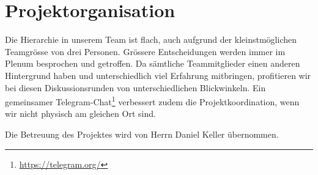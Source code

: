 \documentclass[a4paper]{article}
\let\oldsection\section
\renewcommand\section{\clearpage\oldsection}
\begin{document}
\section{Projektorganisation}
Die Hierarchie in unserem Team ist flach, auch aufgrund der kleinstmöglichen Teamgrösse von drei Personen. Grössere Entscheidungen werden immer im Plenum besprochen und getroffen. Da sämtliche Teammitglieder einen anderen Hintergrund haben und unterschiedlich viel Erfahrung mitbringen, profitieren wir bei diesen Diskussionsrunden von unterschiedlichen Blickwinkeln. Ein gemeinsamer Telegram-Chat\footnote{\url{https://telegram.org/}} verbessert zudem die Projektkoordination, wenn wir nicht physisch am gleichen Ort sind.


Die Betreuung des Projektes wird von Herrn Daniel Keller übernommen.
\end{document}
